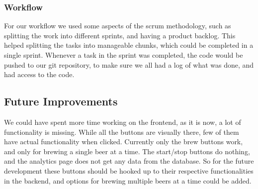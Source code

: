 \subsubsection{Workflow}
For our workflow we used some aspects of the scrum methodology, such as splitting the work into different sprints, and having a product backlog.
This helped splitting the tasks into manageable chunks, which could be completed in a single sprint.
Whenever a task in the sprint was completed, the code would be pushed to our git repository,
to make sure we all had a log of what was done, and had access to the code.

\subsection{Future Improvements}
We could have spent more time working on the frontend, as it is now, a lot of functionality is missing. 
While all the buttons are visually there,
few of them have actual functionality when clicked. \newline
Currently only the brew buttons work, and only for brewing a single beer at a time.
The start/stop buttons do nothing, and the analytics page does not get any data from the database.
\newline
So for the future development these buttons should be hooked up to their respective functionalities in the backend,
and options for brewing multiple beers at a time could be added.